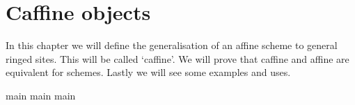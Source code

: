 \chapter{Caffine objects}

In this chapter we will define the generalisation of an affine scheme to general ringed sites.
This will be called `caffine'. We will prove that caffine and affine are equivalent for schemes.
Lastly we will see some examples and uses.


{main}
{main}
{main}